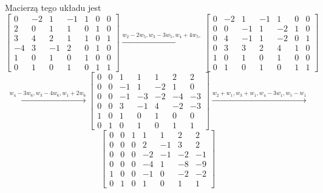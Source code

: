 \documentclass[]{sinol}
\begin{document}
\begin{zadanie}
        Macierzą tego układu jest 
        \[
        \begin{bmatrix}
            0  & -2 &  1  & -1 & 1  & 0 & 0 \\
            2  &  0 &  1  &  1 & 0  & 1 & 0 \\
            3  &  4 &  2  &  1 & 1  & 0 & 1 \\
            -4  &  3 & -1  &  2 & 0  & 1 & 0 \\
            1  &  0 &  1  &  0 & 1  & 0 & 0 \\
            0  &  1 &  0  &  1 & 0  & 1 & 1
        \end{bmatrix}
        \xrightarrow[]{w_2-2w_5, w_3-3w_5, w_4+4w_5,}
        \begin{bmatrix}
            0  & -2 &  1  & -1 & 1  & 0 & 0 \\ 
            0  &  0 &  -1  &  1 & -2  & 1 & 0 \\
            0  &  4 &  -1  &  1 & -2  & 0 & 1 \\
            0  &  3 & 3  &  2 & 4  & 1 & 0 \\
            1  &  0 &  1  &  0 & 1  & 0 & 0 \\
            0  &  1 &  0  &  1 & 0  & 1 & 1
        \end{bmatrix}
        \]
        \[
        \xrightarrow[]{w_4-3w_6, w_3-4w_6, w_1+2w_6}
        \begin{bmatrix}
            0  & 0 &  1  & 1 & 1  & 2 & 2 \\ 
            0  &  0 &  -1  &  1 & -2  & 1 & 0 \\
            0  &  0 &  -1  &  -3 & -2  & -4 & -3 \\
            0  &  0 & 3  &  -1 & 4  & -2 & -3 \\
            1  &  0 &  1  &  0 & 1  & 0 & 0 \\
            0  &  1 &  0  &  1 & 0  & 1 & 1
        \end{bmatrix}
        \xrightarrow[]{w_2+w_1, w_3+w_1, w_4-3w_1, w_5-w_1}
        \]
        \[
        \begin{bmatrix}
            0  & 0 &  1  & 1 & 1  & 2 & 2 \\ 
            0  &  0 &  0  &  2 & -1  & 3 & 2 \\
            0  &  0 &  0  &  -2 & -1  & -2 & -1 \\
            0  &  0 & 0  &  -4 & 1  & -8 & -9 \\
            1  &  0 &  0  &  -1 & 0  & -2 & -2 \\
            0  &  1 &  0  &  1 & 0  & 1 & 1

\end{bmatrix}\]
\end{zadanie}
\end{document}
